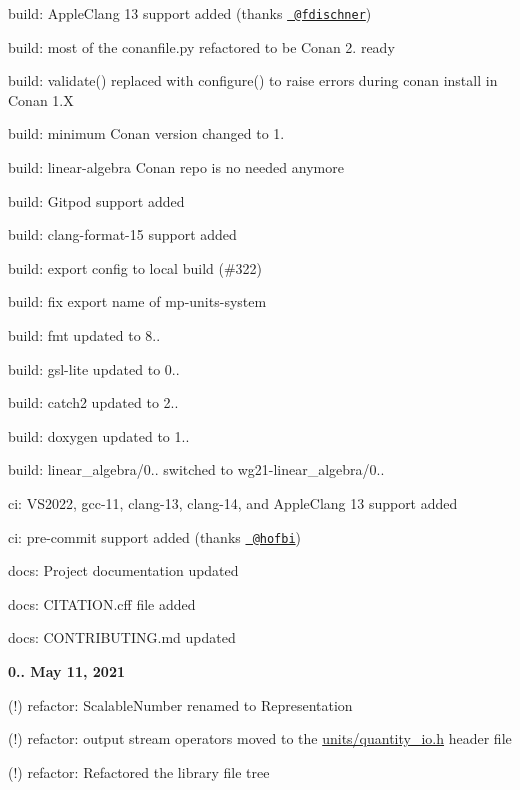 \begin{DoxyItemize}
\begin{DoxyItemize}
\item build\+: Apple\+Clang 13 support added (thanks \href{https://github.com/fdischner}{\texttt{ @fdischner}})
\item build\+: most of the {\ttfamily conanfile.\+py} refactored to be Conan 2. ready
\item build\+: {\ttfamily validate()} replaced with {\ttfamily configure()} to raise errors during {\ttfamily conan install} in Conan 1.\+X
\item build\+: minimum Conan version changed to 1.
\item build\+: {\ttfamily linear-\/algebra} Conan repo is no needed anymore
\item build\+: Gitpod support added
\item build\+: clang-\/format-\/15 support added
\item build\+: export config to local build (\#322)
\item build\+: fix export name of {\ttfamily mp-\/units-\/system}
\item build\+: fmt updated to 8..
\item build\+: gsl-\/lite updated to 0..
\item build\+: catch2 updated to 2..
\item build\+: doxygen updated to 1..
\item build\+: linear\+\_\+algebra/0.. switched to wg21-\/linear\+\_\+algebra/0..
\item ci\+: VS2022, gcc-\/11, clang-\/13, clang-\/14, and Apple\+Clang 13 support added
\item ci\+: pre-\/commit support added (thanks \href{https://github.com/hofbi}{\texttt{ @hofbi}})
\item docs\+: Project documentation updated
\item docs\+: {\ttfamily CITATION.\+cff} file added
\item docs\+: {\ttfamily CONTRIBUTING.\+md} updated
\end{DoxyItemize}
\item {\bfseries{0.. May 11, 2021}}
\begin{DoxyItemize}
\item (!) refactor\+: {\ttfamily Scalable\+Number} renamed to {\ttfamily Representation}
\item (!) refactor\+: output stream operators moved to the {\ttfamily \mbox{\hyperlink{quantity__io_8h_source}{units/quantity\+\_\+io.\+h}}} header file
\item (!) refactor\+: Refactored the library file tree

\end{DoxyItemize}
\end{DoxyItemize}
